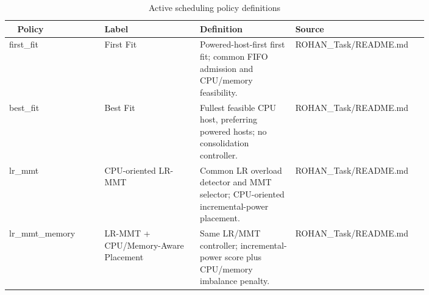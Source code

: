 \begin{longtable}{>{\raggedright\arraybackslash}p{0.200\linewidth}>{\raggedright\arraybackslash}p{0.200\linewidth}>{\raggedright\arraybackslash}p{0.200\linewidth}>{\raggedright\arraybackslash}p{0.200\linewidth}}
\caption{Active scheduling policy definitions}\
\toprule
Policy & Label & Definition & Source \\
\midrule\endhead
first\_fit & First Fit & Powered-host-first first fit; common FIFO admission and CPU/memory feasibility. & ROHAN\_Task/README.md \\
best\_fit & Best Fit & Fullest feasible CPU host, preferring powered hosts; no consolidation controller. & ROHAN\_Task/README.md \\
lr\_mmt & CPU-oriented LR-MMT & Common LR overload detector and MMT selector; CPU-oriented incremental-power placement. & ROHAN\_Task/README.md \\
lr\_mmt\_memory & LR-MMT + CPU/Memory-Aware Placement & Same LR/MMT controller; incremental-power score plus CPU/memory imbalance penalty. & ROHAN\_Task/README.md \\
\bottomrule\end{longtable}
